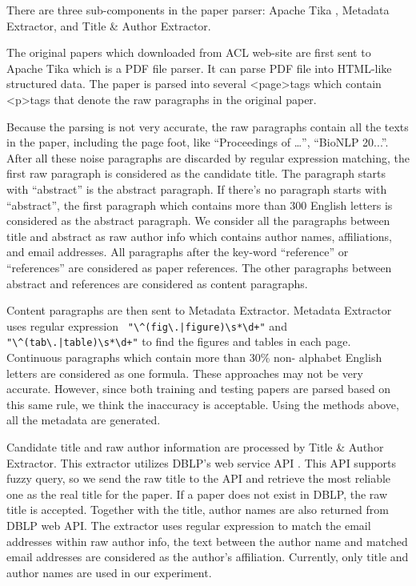 \documentclass[11pt,letterpaper]{article}
\begin{document}
There are three sub-components in the paper parser: Apache Tika , Metadata Extractor, and Title \& Author Extractor. 

The original papers which downloaded from ACL web-site are first sent to Apache Tika which is a PDF file parser. It can parse PDF file into HTML-like structured data. The paper is parsed into several \textless page\textgreater tags which contain \textless p\textgreater tags that denote the raw paragraphs in the original paper. 

Because the parsing is not very accurate, the raw paragraphs contain all the texts in the paper, including the page foot, like ``Proceedings of …'', ``BioNLP 20...''. After all these noise paragraphs are discarded by regular expression matching, the first raw paragraph is considered as the candidate title. The paragraph starts with ``abstract'' is the abstract paragraph. If there's no paragraph starts with ``abstract'', the first paragraph which contains more than 300 English letters is considered as the abstract paragraph. 
We consider all the paragraphs between title and abstract as raw author info which contains author names, affiliations, and email addresses. All paragraphs after the key-word ``reference'' or ``references'' are considered as paper references. The other paragraphs between abstract and references are considered as content paragraphs. 

Content paragraphs are then sent to Metadata Extractor. Metadata Extractor uses regular expression \verb- "\^(fig\.|figure)\s*\d+"- and  \verb-"\^(tab\.|table)\s*\d+"- to find the figures and tables in each page. Continuous paragraphs which contain more than 30\% non- alphabet English letters are considered as one formula. These approaches may not be very accurate. However, since both training and testing papers are parsed based on this same rule, we think the inaccuracy is acceptable. Using the methods above, all the metadata are generated. 

Candidate title and raw author information are processed by Title \& Author Extractor. This extractor utilizes DBLP's web service API . This API supports fuzzy query, so we send the raw title to the API and retrieve the most reliable one as the real title for the paper. If a paper does not exist in DBLP, the raw title is accepted. Together with the title, author names are also returned from DBLP web API. The extractor uses regular expression to match the email addresses within raw author info, the text between the author name and matched email addresses are considered as the author’s affiliation. Currently, only title and author names are used in our experiment. 
\end{document}
